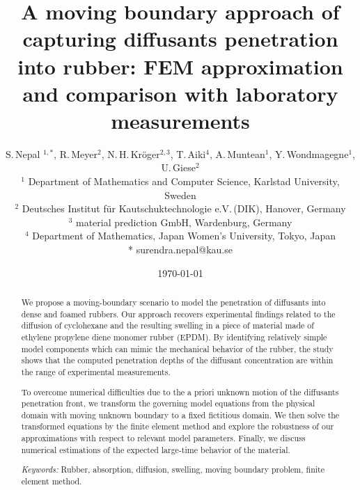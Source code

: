 \documentclass{article}
\begin{document}
\nocite{*} %

\title{A moving boundary approach of capturing diffusants penetration into rubber: FEM approximation and comparison with laboratory measurements}
 \author{S.\,Nepal $^{1,*}$,  R.\,Meyer$^{2}$, N.\,H.\,Kr\"oger$^{2,3}$, T.\,Aiki$^4$, A.\,Muntean$^1$, Y.\,Wondmagegne$^1$, U.\,Giese$^2$ \\
$^1$ Department of Mathematics and Computer Science, Karlstad University, Sweden\\
$^2$ Deutsches Institut f\"ur Kautschuktechnologie e.V.\,(DIK), Hanover, Germany\\
$^3$ material prediction GmbH, Wardenburg, Germany\\
$^4$ Department of Mathematics, Japan Women's University, Tokyo,  Japan\\
* surendra.nepal@kau.se}


\date{\today} %

\maketitle
\noindent
\begin{abstract}

We propose a moving-boundary scenario to model the penetration of diffusants into dense and foamed rubbers. Our approach recovers experimental findings related to the diffusion of cyclohexane and the resulting swelling in a piece of material made of ethylene propylene diene monomer rubber (EPDM). By identifying relatively simple model components which can mimic the mechanical behavior of the rubber, the study shows that the computed penetration depths of the diffusant concentration are within the range of experimental measurements.

To overcome numerical difficulties due to the a priori unknown motion of the diffusants penetration front, we transform the governing model equations from the physical domain with moving unknown boundary to a fixed fictitious domain. We then solve the transformed equations by the finite element method and explore the robustness of our approximations with respect to relevant model parameters.  Finally, we discuss numerical estimations of the expected large-time behavior of the material.

\vskip1cm
\noindent \textit{Keywords:} 
Rubber, absorption, diffusion, swelling, moving boundary problem, finite element method.

\end{abstract}
\end{document}
